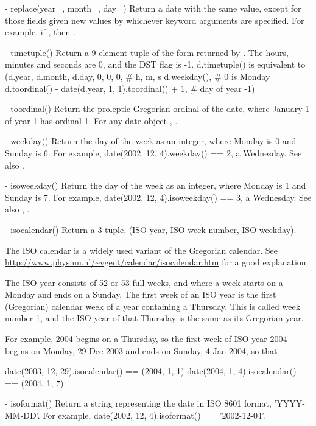   - replace(year=, month=, day=)
    Return a date with the same value, except for those fields given
    new values by whichever keyword arguments are specified.  For
    example, if , then
    .

  - timetuple()
    Return a 9-element tuple of the form returned by
    .  The hours, minutes and seconds are
    0, and the DST flag is -1.
    d.timetuple() is equivalent to
        (d.year, d.month, d.day,
         0, 0, 0,  \# h, m, s
         d.weekday(),  \# 0 is Monday
         d.toordinal() - date(d.year, 1, 1).toordinal() + 1, \# day of year
         -1)

  - toordinal()
    Return the proleptic Gregorian ordinal of the date, where January 1
    of year 1 has ordinal 1.  For any date object ,
    .

  - weekday()
    Return the day of the week as an integer, where Monday is 0 and
    Sunday is 6.  For example, date(2002, 12, 4).weekday() == 2, a
    Wednesday.
    See also .

  - isoweekday()
    Return the day of the week as an integer, where Monday is 1 and
    Sunday is 7.  For example, date(2002, 12, 4).isoweekday() == 3, a
    Wednesday.
    See also , .

  - isocalendar()
    Return a 3-tuple, (ISO year, ISO week number, ISO weekday).

    The ISO calendar is a widely used variant of the Gregorian calendar.
    See \url{http://www.phys.uu.nl/~vgent/calendar/isocalendar.htm}
    for a good explanation.

    The ISO year consists of 52 or 53 full weeks, and where a week starts
    on a Monday and ends on a Sunday.  The first week of an ISO year is
    the first (Gregorian) calendar week of a year containing a Thursday.
    This is called week number 1, and the ISO year of that Thursday is
    the same as its Gregorian year.

    For example, 2004 begins on a Thursday, so the first week of ISO
    year 2004 begins on Monday, 29 Dec 2003 and ends on Sunday, 4 Jan
    2004, so that

    date(2003, 12, 29).isocalendar() == (2004, 1, 1)
    date(2004, 1, 4).isocalendar() == (2004, 1, 7)

  - isoformat()
    Return a string representing the date in ISO 8601 format,
    'YYYY-MM-DD'.  For example,
    date(2002, 12, 4).isoformat() == '2002-12-04'.

